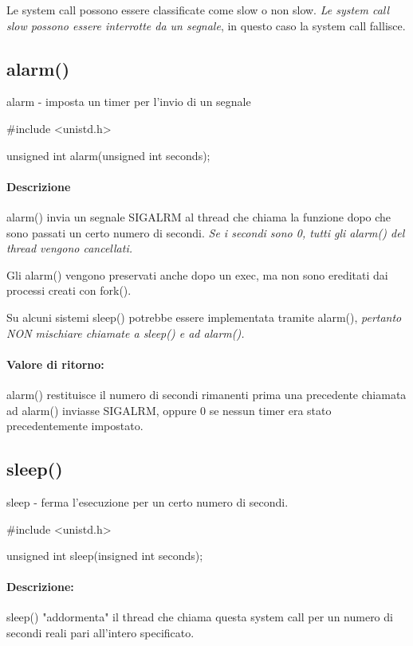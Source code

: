 \documentclass
[10pt,        %
 a4paper,     %
 onecolumn,   %
 fleqn,       %
 oneside,     %
 notitlepage, %
]{article}    %
\begin{document}
Le system call possono essere classificate come slow o non slow. \textit{Le system call slow possono essere interrotte da un segnale}, in questo caso la system call fallisce.

\subsection{alarm()}
alarm - imposta un timer per l'invio di un segnale

\begin{C}
#include <unistd.h>

unsigned int alarm(unsigned int seconds);
\end{C}

\paragraph{Descrizione}
alarm() invia un segnale SIGALRM al thread che chiama la funzione dopo che sono passati un certo numero di secondi. \textit{Se i secondi sono 0, tutti gli alarm() del thread vengono cancellati.}

Gli alarm() vengono preservati anche dopo un exec, ma non sono ereditati dai processi creati con fork().

Su alcuni sistemi sleep() potrebbe essere implementata tramite alarm(), \textit{pertanto NON mischiare chiamate a sleep() e ad alarm().}

\paragraph{Valore di ritorno:}
alarm() restituisce il numero di secondi rimanenti prima una precedente chiamata ad alarm() inviasse SIGALRM, oppure 0 se nessun timer era stato precedentemente impostato.

\subsection{sleep()}
sleep - ferma l'esecuzione per un certo numero di secondi.

\begin{C}
#include <unistd.h>

unsigned int sleep(insigned int seconds);
\end{C}

\paragraph{Descrizione:}
sleep() "addormenta" il thread che chiama questa system call per un numero di secondi reali pari all'intero specificato.
\end{document}
